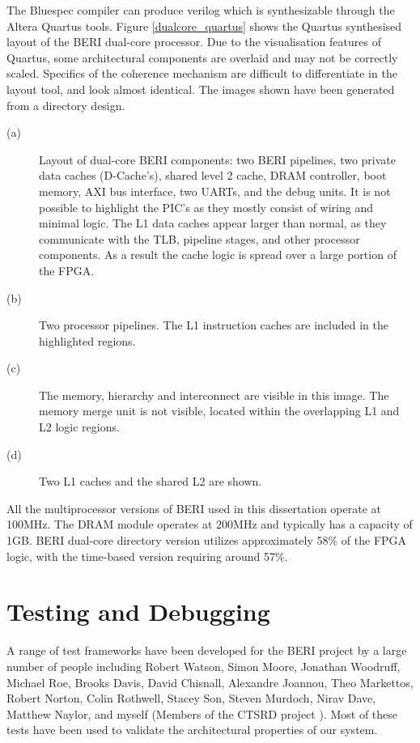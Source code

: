 \begin{comment}	
	\begin{figure}[!h]
		\centering 
			\makebox{\texttt{[image: dualcore\_fpga]}}
			\caption{Dual-Core BERI FPGA Layout} \label{dualcore_fpga}
	\end{figure}
\end{comment}

	The Bluespec compiler can produce verilog which is synthesizable through the Altera Quartus tools. Figure \ref{dualcore_quartus} shows the Quartus synthesised layout of the BERI dual-core processor. Due to the visualisation features of Quartus, some architectural components are overlaid and may not be correctly scaled. Specifics of the coherence mechanism are difficult to differentiate in the layout tool, and look almost identical. The images shown have been generated from a directory design.
	
	\begin{description}
		\item[(a)] Layout of dual-core BERI components: two BERI pipelines, two private data caches (D-Cache's), shared level 2 cache, DRAM controller, boot memory, AXI bus interface, two UARTs, and the debug units. It is not possible to highlight the PIC's as they mostly consist of wiring and minimal logic. The L1 data caches appear larger than normal, as they communicate with the TLB, pipeline stages, and other processor components. As a result the cache logic is spread over a large portion of the FPGA.
		\item[(b)] Two processor pipelines. The L1 instruction caches are included in the highlighted regions.
		\item[(c)] The memory, hierarchy and interconnect are visible in this image. The memory merge unit is not visible, located within the overlapping L1 and L2 logic regions.
		\item[(d)] Two L1 caches and the shared L2 are shown. 
	\end{description}
	
	All the multiprocessor versions of BERI used in this dissertation operate at 100MHz. The DRAM module operates at 200MHz and typically has a capacity of 1GB. BERI dual-core directory version utilizes approximately 58\% of the FPGA logic, with the time-based version requiring around 57\%.

\section{Testing and Debugging}
	A range of test frameworks have been developed for the BERI project by a large number of people including Robert Watson, Simon Moore, Jonathan Woodruff, Michael Roe, Brooks Davis, David Chisnall, Alexandre Joannou, Theo Markettos, Robert Norton, Colin Rothwell, Stacey Son, Steven Murdoch, Nirav Dave, Matthew Naylor, and myself (Members of the CTSRD project \cite{ctsrd15}). Most of these tests have been used to validate the architectural properties of our system.

